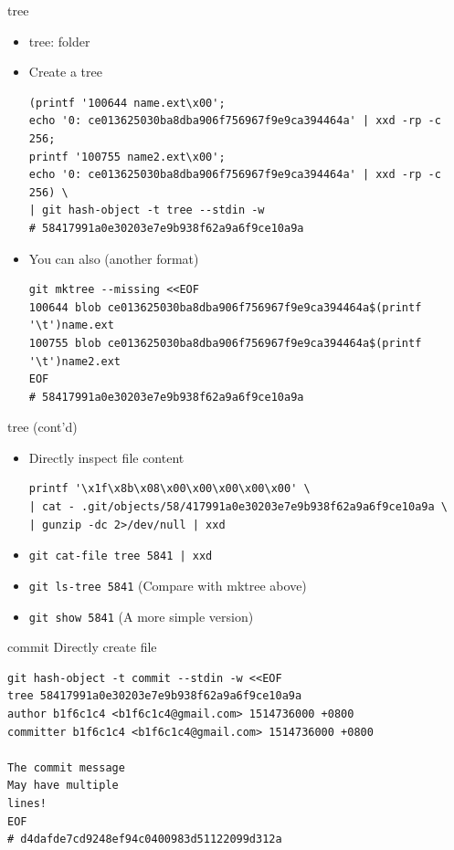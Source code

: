 \documentclass[aspectratio=169]{beamer}
\newcommand{\T}[1]{\texttt{#1}}
\begin{document}
\begin{frame}[fragile]{tree}
  \begin{itemize}
    \item<1-> tree: folder
    \item<2-> Create a tree\begin{verbatim}
(printf '100644 name.ext\x00';
echo '0: ce013625030ba8dba906f756967f9e9ca394464a' | xxd -rp -c 256;
printf '100755 name2.ext\x00';
echo '0: ce013625030ba8dba906f756967f9e9ca394464a' | xxd -rp -c 256) \
| git hash-object -t tree --stdin -w
# 58417991a0e30203e7e9b938f62a9a6f9ce10a9a
\end{verbatim}
    \item<3-> You can also (another format)\begin{verbatim}
git mktree --missing <<EOF
100644 blob ce013625030ba8dba906f756967f9e9ca394464a$(printf '\t')name.ext
100755 blob ce013625030ba8dba906f756967f9e9ca394464a$(printf '\t')name2.ext
EOF
# 58417991a0e30203e7e9b938f62a9a6f9ce10a9a
\end{verbatim}
  \end{itemize}
\end{frame}

\begin{frame}[fragile]{tree (cont'd)}
  \begin{itemize}
    \item<1-> Directly inspect file content\begin{verbatim}
printf '\x1f\x8b\x08\x00\x00\x00\x00\x00' \
| cat - .git/objects/58/417991a0e30203e7e9b938f62a9a6f9ce10a9a \
| gunzip -dc 2>/dev/null | xxd
\end{verbatim}
    \item<2-> \T{git cat-file tree 5841 | xxd}
    \item<3-> \T{git ls-tree 5841} (Compare with mktree above)
    \item<4-> \T{git show 5841} (A more simple version)
  \end{itemize}
\end{frame}

\begin{frame}[fragile]{commit}
  Directly create file\begin{verbatim}
git hash-object -t commit --stdin -w <<EOF
tree 58417991a0e30203e7e9b938f62a9a6f9ce10a9a
author b1f6c1c4 <b1f6c1c4@gmail.com> 1514736000 +0800
committer b1f6c1c4 <b1f6c1c4@gmail.com> 1514736000 +0800

The commit message
May have multiple
lines!
EOF
# d4dafde7cd9248ef94c0400983d51122099d312a
\end{verbatim}
\end{frame}
\end{document}
